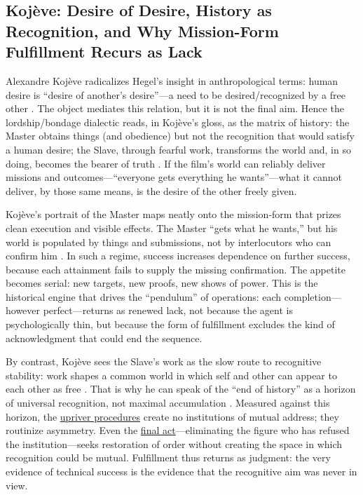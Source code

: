 \subsection*{Koj{\`e}ve: Desire of Desire, History as Recognition, and Why Mission-Form
	Fulfillment Recurs as Lack}
\label{ssec:iii-kojeve}
Alexandre Koj{\`e}ve radicalizes Hegel's insight in anthropological terms: human desire is
``desire of another's desire''—a need to be desired/recognized by a free other
\parencite[p.~6]{KojeveIRH1980}.
The object mediates this relation, but it is not the final aim. Hence the lordship/bondage
dialectic reads, in Koj{\`e}ve's gloss, as the matrix of history: the Master obtains things
(and obedience) but not the recognition that would satisfy a human desire; the Slave, through
fearful work, transforms the world and, in so doing, becomes the bearer of truth
\parencite[pp.~27--34, 158--164]{KojeveIRH1980}. If the film's world can reliably deliver
missions and outcomes—``everyone gets everything he wants''—what it cannot deliver, by those
same means, is the desire of the other freely given.

Koj{\`e}ve's portrait of the Master maps neatly onto the mission-form that prizes clean
execution and visible effects. The Master ``gets what he wants,'' but his world is populated by
things and submissions, not by interlocutors who can confirm him
\parencite[pp.~27--34]{KojeveIRH1980}. In such a regime, success increases dependence on further
success, because each attainment fails to supply the missing confirmation. The appetite becomes
serial: new targets, new proofs, new shows of power. This is the historical engine that drives
the ``pendulum'' of operations: each completion—however perfect—returns as renewed lack, not
because the agent is psychologically thin, but because the form of fulfillment excludes the kind
of acknowledgment that could end the sequence.

By contrast, Koj{\`e}ve sees the Slave's work as the slow route to recognitive stability: work
shapes a common world in which self and other can appear to each other as free
\parencite[pp.~158--164]{KojeveIRH1980}. That is why he can speak of the ``end of history'' as
a horizon of universal recognition, not maximal accumulation
\parencite[pp.~158--164]{KojeveIRH1980}. Measured against this horizon, the
\hyperref[scene:upriver-journey]{upriver procedures} create no institutions of mutual address;
they routinize asymmetry. Even the \hyperref[scene:assassination]{final act}—eliminating
the figure who has refused the institution—seeks restoration of order without creating the space
in which recognition could be mutual. Fulfillment thus returns as judgment: the very evidence of
technical success is the evidence that the recognitive aim was never in view.

